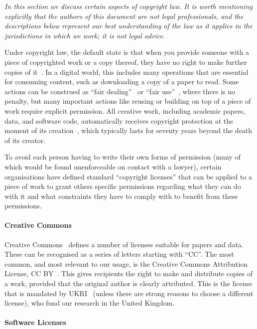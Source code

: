 \documentclass{article}
\begin{document}
\emph{
  In this section we discuss certain aspects of copyright law.
  It is worth mentioning explicitly that
  the authors of this document are not legal professionals,
  and the descriptions below represent our best understanding of the law
  as it applies in the jurisdictions in which we work;
  it is not legal advice.
}

Under copyright law,
the default state is that
when you provide someone with a piece of copyrighted work
or a copy thereof,
they have no right to make further copies of it~\cite{yu}.
In a digital world,
this includes many operations that are essential for consuming content,
such as downloading a copy of a paper to read.
Some actions can be construed as
``fair dealing''~\cite{fairdealing}
or ``fair use''~\cite{fairuse},
where there is no penalty,
but many important actions
like reusing or building on top of a piece of work
require explicit permission.
All creative work,
including academic papers, data, and software code,
automatically receives copyright protection at the moment of its creation~\cite{berne},
which typically lasts for seventy years beyond the death of its creator.

To avoid each person having to write their own forms of permission
(many of which would be found unenforceable on contact with a lawyer),
certain organisations have defined standard ``copyright licenses''
that can be applied to a piece of work
to grant others specific permissions regarding what they can do with it
and what constraints they have to comply with to benefit from these permissions.

\paragraph{Creative Commons}

Creative Commons~\cite{creativecommons}
defines a number of licenses suitable for papers and data.
These can be recognised as a series of letters starting with ``CC''.
The most common,
and most relevant to our usage,
is the Creative Commons Attribution License,
CC BY~\cite{cc-by}.
This gives recipients the right to make and distribute copies of a work,
provided that the original author is clearly attributed.
This is the license that is mandated by UKRI~\cite{ukri-openaccess,ukri-opendata}
(unless there are strong reasons to choose a different license),
who fund our research in the United Kingdom.

\paragraph{Software Licenses}
\end{document}
